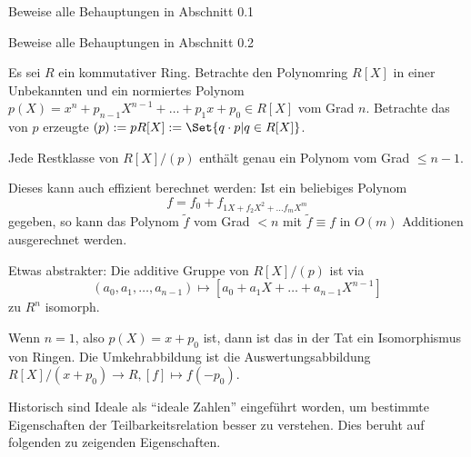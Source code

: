 \begin{sheet}

    \begin{problem}[title={Gruppen}]
        Beweise alle Behauptungen in Abschnitt 0.1
    \end{problem}

    \begin{problem}[title={Ringe}]
        Beweise alle Behauptungen in Abschnitt 0.2
    \end{problem}

    \begin{problem}[title={Quotienten von Polynomringen I}]
        Es sei $R$ ein kommutativer Ring. Betrachte den Polynomring $R[X]$ in einer Unbekannten und ein normiertes Polynom $p(X) = x^n + p_{n-1} X^{n-1} + \ldots + p_1 x+p_0 \in R[X]$ vom Grad $n$. Betrachte das von $p$ erzeugte  $(p):=pR[X]:=\Set{q\cdot p | q\in R[X]}$.


        \begin{subproblem}
            Jede Restklasse von $R[X]/(p)$ enthält genau ein Polynom vom Grad $\leq n-1$.

            Dieses kann auch effizient berechnet werden: Ist ein beliebiges Polynom
            \[f = f_0 + f_{1X + f_2 X ^2 + \ldots f_m X^m}\]
            gegeben, so kann das Polynom $\tilde{f}$ vom Grad $<n$ mit $\tilde{f} \equiv f$ in $O(m)$ Additionen ausgerechnet werden.
        \end{subproblem}

        \begin{subproblem}
            Etwas abstrakter: Die additive Gruppe von $R[X]/(p)$ ist via
            \[(a_0,a_1,\ldots,a_{n-1}) \mapsto [a_0+a_1 X+\ldots +a_{n-1}X^{n-1}]\]
            zu $R^n$ isomorph.
        \end{subproblem}

        \begin{subproblem}
            Wenn $n=1$, also $p(X) = x+p_0$ ist, dann ist das in der Tat ein Isomorphismus von Ringen. Die Umkehrabbildung ist die Auswertungsabbildung $R[X]/(x+p_0) \to R, [f] \mapsto f(-p_0)$.
        \end{subproblem}
    \end{problem}

    \begin{problem}[title={Ideale vs. Teilbarkeit}]
        Historisch sind Ideale als \enquote{ideale Zahlen} eingeführt worden, um bestimmte Eigenschaften der Teilbarkeitsrelation besser zu verstehen. Dies beruht auf folgenden zu zeigenden Eigenschaften.


\end{problem}
\end{sheet}
